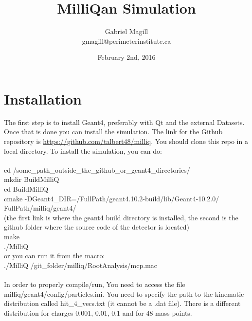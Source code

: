 \documentclass[prd,noshowpacs,nofootinbib,amsmath,amssymb,superscriptaddress]{revtex4}
\begin{document}
\title{MilliQan Simulation}
\author{Gabriel Magill\\ gmagill@perimeterinstitute.ca}
\date{February 2nd, 2016}

\newcommand{\be}{\begin{equation}}
\newcommand{\ee}{\end{equation}}
\newcommand{\bea}{\begin{eqnarray}}
\newcommand{\eea}{\end{eqnarray}}
\newcommand{\Gev}{\,\,\mathrm{GeV}}
\newcommand{\SUWeak}{\mathrm{SU}(2)_{\rm W}}
\newcommand{\Lag}{\mathcal{L}}
\newcommand{\Lagtree}{\mathcal{L}_{\rm tree}}
\newcommand{\benum}{\begin{enumerate}}
\newcommand{\eenum}{\end{enumerate}}
\newcommand{\bi}{\begin{itemize}}
\newcommand{\ei}{\end{itemize}}
\newcommand{\Mp}{M_{\rm Pl}}
\maketitle



\section{Installation}
The first step is to install Geant4, preferably with Qt and the external Datasets. Once that is done you can install the simulation.
The link for the Github repository is \url{https://github.com/talbert48/milliq}. You should clone this repo in a local directory.  
To install the simulation, you can do:\\ \\
%
cd /some\_path\_outside\_the\_github\_or\_geant4\_directories/ \\
mkdir BuildMilliQ \\
cd BuildMilliQ \\
cmake -DGeant4\_DIR=/FullPath/geant4.10.2-build/lib/Geant4-10.2.0/ FullPath/milliq/geant4/ \\
(the first link is where the geant4 build directory is installed, the second is the github folder where the source code of the detector is located)\\
make \\
./MilliQ \\
or you can run it from the macro:\\
./MilliQ /git\_folder/milliq/RootAnalysis/mcp.mac \\ \\
% 
In order to properly compile/run, You need to access the file milliq/geant4/config/particles.ini. You need to specify the path to the kinematic distribution called hit\_4\_vecs.txt (it cannot be a .dat file). 
There is a different distribution for charges 0.001, 0.01, 0.1 and for 48 mass points.
\end{document}

